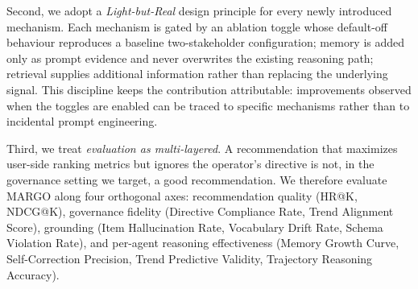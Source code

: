 \documentclass[master,english,final]{postech-ucs}
\begin{document}
Second, we adopt a \emph{Light-but-Real} design principle for every newly introduced mechanism.
Each mechanism is gated by an ablation toggle whose default-off behaviour reproduces a baseline two-stakeholder configuration; memory is added only as prompt evidence and never overwrites the existing reasoning path; retrieval supplies additional information rather than replacing the underlying signal.
This discipline keeps the contribution attributable: improvements observed when the toggles are enabled can be traced to specific mechanisms rather than to incidental prompt engineering.

Third, we treat \emph{evaluation as multi-layered}.
A recommendation that maximizes user-side ranking metrics but ignores the operator's directive is not, in the governance setting we target, a good recommendation.
We therefore evaluate MARGO along four orthogonal axes: recommendation quality (HR@K, NDCG@K), governance fidelity (Directive Compliance Rate, Trend Alignment Score), grounding (Item Hallucination Rate, Vocabulary Drift Rate, Schema Violation Rate), and per-agent reasoning effectiveness (Memory Growth Curve, Self-Correction Precision, Trend Predictive Validity, Trajectory Reasoning Accuracy).
\end{document}
